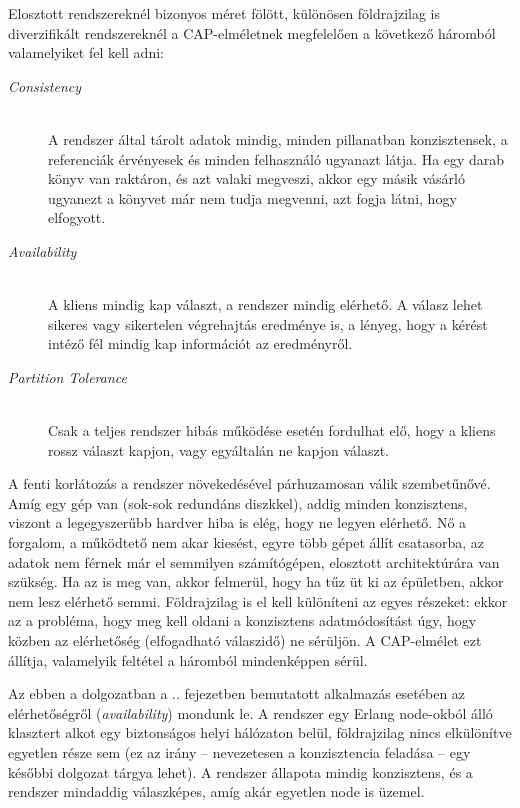 \documentclass[12pt, a4paper, oneside]{book}
\begin{document}
Elosztott rendszereknél bizonyos méret fölött, különösen földrajzilag is
diverzifikált rendszereknél a CAP-elméletnek megfelelően a következő háromból
valamelyiket fel kell adni:
\begin{description}
\item[\emph{Consistency}] \hfill \\
 A rendszer által tárolt adatok mindig, minden pillanatban konzisztensek, a
referenciák érvényesek és minden felhasználó ugyanazt látja. Ha egy darab könyv
van raktáron, és azt valaki megveszi, akkor egy másik vásárló ugyanezt a
könyvet már nem tudja megvenni, azt fogja látni, hogy elfogyott.

\item[\emph{Availability}] \hfill \\
  A kliens mindig kap választ, a rendszer mindig elérhető. A válasz lehet
sikeres vagy sikertelen végrehajtás eredménye is, a lényeg, hogy a kérést
intéző fél mindig kap információt az eredményről.

\item[\emph{Partition Tolerance}] \hfill \\
 Csak a teljes rendszer hibás működése esetén fordulhat elő, hogy a kliens
rossz választ kapjon, vagy egyáltalán ne kapjon választ.
\end{description}

\noindent A fenti korlátozás a rendszer növekedésével párhuzamosan válik
szembetűnővé. Amíg egy gép van (sok-sok redundáns diszkkel), addig minden
konzisztens, viszont a legegyszerűbb hardver hiba is elég, hogy ne legyen
elérhető. Nő a forgalom, a működtető nem akar kiesést, egyre több gépet állít
csatasorba, az adatok nem férnek már el semmilyen számítógépen, elosztott
architektúrára van szükség. Ha az is meg van, akkor felmerül, hogy ha tűz üt ki
az épületben, akkor nem lesz elérhető semmi. Földrajzilag is el kell különíteni
az egyes részeket: ekkor az a probléma, hogy meg kell oldani a konzisztens
adatmódosítást úgy, hogy közben az elérhetőség (elfogadható válaszidő) ne
sérüljön. A CAP-elmélet ezt állítja, valamelyik feltétel a háromból
mindenképpen sérül.

Az ebben a dolgozatban a .. fejezetben bemutatott alkalmazás esetében az
elérhetőségről (\emph{availability}) mondunk le. A rendszer egy Erlang
node-okból álló klasztert alkot egy biztonságos helyi hálózaton belül,
földrajzilag nincs elkülönítve egyetlen része sem (ez az irány -- nevezetesen a
konzisztencia feladása -- egy későbbi dolgozat tárgya lehet). A rendszer
állapota mindig konzisztens, és a rendszer mindaddig válaszképes, amíg akár
egyetlen node is üzemel.
\end{document}

